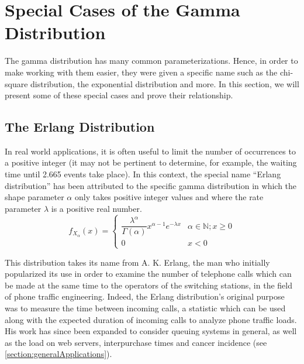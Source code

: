 \documentclass[12pt]{article}
\begin{document}
\pagebreak
\section{Special Cases of the Gamma Distribution}
The gamma distribution has many common parameterizations. Hence, in order to make working with them easier, they were
given a specific name such as the chi-square distribution, the exponential distribution and more. In this section, we
will present some of these special cases and prove their relationship.

\subsection{The Erlang Distribution}
In real world applications, it is often useful to limit the number of occurrences to a positive integer (it may not be
pertinent to determine, for example, the waiting time until 2.665 events take place). In this context, the special name
“Erlang distribution” has been attributed to the specific gamma distribution in which the shape parameter $\alpha$ only
takes positive integer values and where the rate parameter $\lambda$ is a positive real number.
\begin{equation*}
	f_{X_\alpha}(x)	= 	\begin{cases}
							\dfrac{\lambda^\alpha}{\Gamma(\alpha)}x^{\alpha-1}e^{-\lambda x}  & \alpha\in\mathbb{N}; x\geq0\\
							0  & x<0
  						\end{cases}
\end{equation*}

This distribution takes its name from A. K. Erlang, the man who initially popularized its use in order to examine the
number of telephone calls which can be made at the same time to the operators of the switching stations, in the field of
phone traffic engineering. Indeed, the Erlang distribution's original purpose was to measure the time between incoming
calls, a statistic which can be used along with the expected duration of incoming calls to analyze phone traffic loads.
His work has since been expanded to consider queuing systems in general, as well as the load on web servers,
interpurchase times and cancer incidence (see \autoref{section:generalApplications})\cite{zachWhatErlangDistribution2020}.

\end{document}
